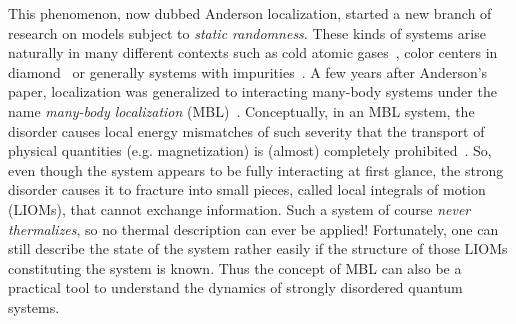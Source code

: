 This phenomenon, now dubbed Anderson localization, started a new branch of research on models subject to \emph{static randomness}. These kinds of systems arise naturally in many different contexts such as cold atomic gases~\cite{schreiberObservationManybodyLocalization2015,kondovDisorderInducedLocalizationStrongly2015}, color centers in diamond~\cite{kucskoCriticalThermalizationDisordered2018,martinControllingLocalThermalization2023} or generally systems with impurities~\cite{weiExploringLocalizationNuclear2018,silevitchTuningHighQNonlinear2019}. A few years after Anderson's paper, localization was generalized to interacting many-body systems under the name \emph{many-body localization} (MBL)~\cite{fleishmanInteractionsAndersonTransition1980,baskoMetalinsulatorTransitionWeakly2006,gornyiInteractingElectronsDisordered2005,bauerAreaLawsManybody2013}. Conceptually, in an MBL system, the disorder causes local energy mismatches of such severity that the transport of physical quantities (e.g. magnetization) is (almost) completely prohibited~\cite{serbynLocalConservationLaws2013,husePhenomenologyFullyManybodylocalized2014,imbrieReviewLocalIntegrals2017}. So, even though the system appears to be fully interacting at first glance, the strong disorder causes it to fracture into small pieces, called local integrals of motion (LIOMs), that cannot exchange information. Such a system of course \emph{never thermalizes}, so no thermal description can ever be applied! Fortunately, one can still describe the state of the system rather easily if the structure of those LIOMs constituting the system is known. Thus the concept of MBL can also be a practical tool to understand the dynamics of strongly disordered quantum systems.

